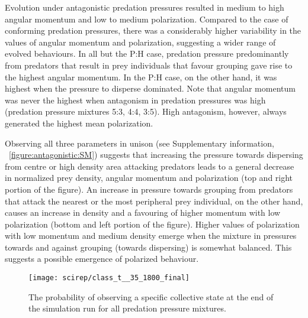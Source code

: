 Evolution under antagonistic predation pressures resulted in medium to high angular momentum and low to medium polarization. Compared to the case of conforming predation pressures, there was a considerably higher variability in the values of angular momentum and polarization, suggesting a wider range of evolved behaviours. In all but the P:H case, predation pressure predominantly from predators that result in prey individuals that favour grouping gave rise to the highest angular momentum. In the P:H case, on the other hand, it was highest when the pressure to disperse dominated. Note that angular momentum was never the highest when antagonism in predation pressures was high (predation pressure mixtures 5:3, 4:4, 3:5). High antagonism, however, always generated the highest mean polarization.

Observing all three parameters in unison (see Supplementary information, \figurename~\ref{figure:antagonistic:SM}) suggests that increasing the pressure towards dispersing from centre or high density area attacking predators leads to a general decrease in normalized prey density, angular momentum and polarization (top and right portion of the figure). An increase in pressure towards grouping from predators that attack the nearest or the most peripheral prey individual, on the other hand, causes an increase in density and a favouring of higher momentum with low polarization (bottom and left portion of the figure). Higher values of polarization with low momentum and medium density emerge when the mixture in pressures towards and against grouping (towards dispersing) is somewhat balanced. This suggests a possible emergence of polarized behaviour.

\begin{figure}
  \texttt{[image: scirep/class\_t\_\_35\_1800\_final]}
  \caption{The probability of observing a specific collective state at the end of the simulation run for all predation pressure mixtures.}
  \label{figure:classification}
\end{figure}

